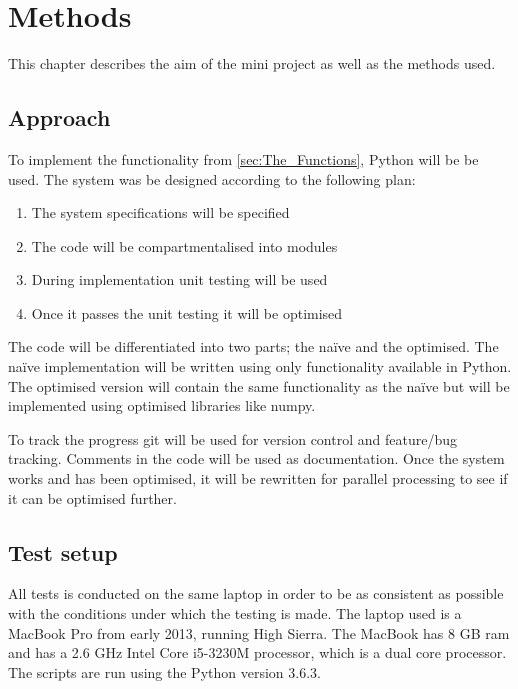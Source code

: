 \chapter{Methods}
This chapter describes the aim of the mini project as well as the methods used.

\section{Approach} 
To implement the functionality from \autoref{sec:The_Functions}, Python will be be used. The system was be designed according to the following plan:

\begin{enumerate}
	\item The system specifications will be specified
	\item The code will be compartmentalised into modules
	\item During implementation unit testing will be used
	\item Once it passes the unit testing it will be optimised
\end{enumerate}

The code will be differentiated into two parts; the na\"ive and the optimised. The na\"ive implementation will be written using only functionality available in Python. The optimised version will contain the same functionality as the na\"ive but will be implemented using optimised libraries like numpy.

To track the progress git will be used for version control and feature/bug tracking. Comments in the code will be used as documentation. Once the system works and has been optimised, it will be rewritten for parallel processing to see if it can be optimised further. 


\section{Test setup}
All tests is conducted on the same laptop in order to be as consistent as possible with the conditions under which the testing is made. The laptop used is a MacBook Pro from early 2013, running High Sierra. The MacBook has 8 GB ram and has a 2.6 GHz Intel Core i5-3230M processor, which is a dual core processor. The scripts are run using the Python version 3.6.3. 